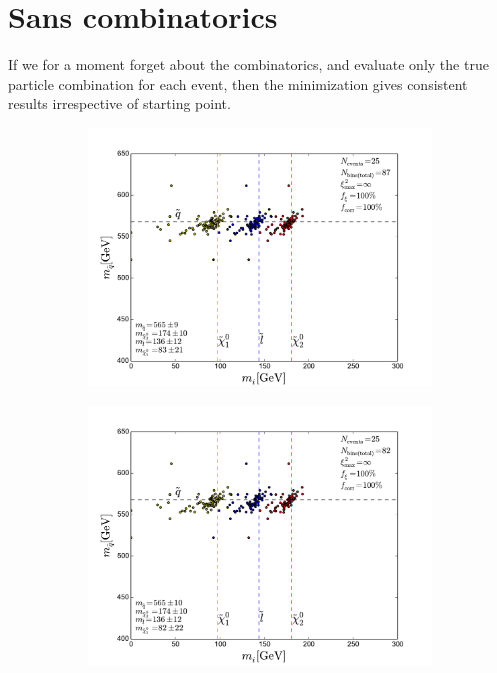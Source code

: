 \documentclass[twoside,english]{uiofysmaster}
\begin{document}
\section{Sans combinatorics}
\label{sec:without_combinatorics}
If we for a moment forget about the combinatorics, and evaluate only the true particle combination for each event, then the minimization gives consistent results irrespective of starting point. 
\begin{figure}[hbt]
	\centering
	\begin{subfigure}[b]{0.45\textwidth}
		\includegraphics[width=\textwidth]{figures/improving_combinatorics/herwigpp-momcons_nocomb_truemasspoint.pdf} 
		\caption{ }
  \label{fig:starting_point_sensitivity_no_combinatorics_a}
	\end{subfigure}
	\begin{subfigure}[b]{0.45\textwidth}
		\includegraphics[width=\textwidth]{figures/improving_combinatorics/herwigpp-momcons_nocomb_400-300-200-100.pdf}
		\caption{ } 
  \label{fig:starting_point_sensitivity_no_combinatorics_b}
	\end{subfigure}


\end{figure}
\end{document}
